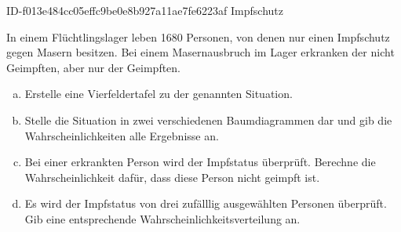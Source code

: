 \begin{exercise}
      {ID-f013e484cc05effc9be0e8b927a11ae7fe6223af}
      {Impfschutz}
  \ifproblem\problem\par
    In einem Flüchtlingslager leben \num{1680} Personen,
    von denen nur  einen Impfschutz gegen Masern
    besitzen.
    Bei einem Masernausbruch im Lager erkranken 
    der nicht Geimpften, aber nur  der Geimpften.
    \begin{enumerate}[a)]
      \item Erstelle eine Vierfeldertafel zu der genannten
            Situation.
      \item Stelle die Situation in zwei verschiedenen
            Baumdiagrammen dar und gib die
            Wahrscheinlichkeiten alle Ergebnisse an.
      \item Bei einer erkrankten Person wird der
            Impfstatus überprüft. Berechne die
            Wahrscheinlichkeit dafür, dass diese Person
            nicht geimpft ist.
      \item Es wird der Impfstatus von drei zufälllig
            ausgewählten Personen überprüft.
            Gib eine entsprechende
            Wahrscheinlichkeitsverteilung an.
    \end{enumerate}
  \fi
\end{exercise}
